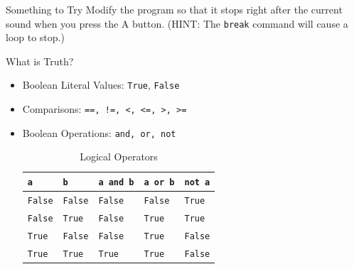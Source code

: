 \documentclass[handout]{beamer}
\newenvironment{code}{%
 \VerbatimEnvironment
 \begin{adjustbox}{max width=\textwidth, max height=0.7\textheight}
 \begin{BVerbatim}
  }{
  \end{BVerbatim}
 \end{adjustbox}
}
\begin{document}
\begin{frame}{Something to Try}
        Modify the program so that it stops right after the current sound when you press the A button. (HINT: The \texttt{break} command will cause a loop to stop.)
\end{frame}

\begin{frame}{What is Truth?}
    \begin{itemize}
        \item Boolean Literal Values: \texttt{True}, \texttt{False}
        \item Comparisons: \texttt{==, !=, <, <=, >, >=}
        \item Boolean Operations: \texttt{and, or, not}
        \begin{table}[h]
            \centering
            \begin{tabular}{ll|lll}
                 \texttt{a} & \texttt{b} & \texttt{a and b} & \texttt{a or b} & \texttt{not a}  \\
                 \hline
                 \texttt{False} & \texttt{False} & \texttt{False} & \texttt{False} & \texttt{True}  \\
                 \texttt{False} & \texttt{True} & \texttt{False} & \texttt{True} & \texttt{True}  \\
                 \texttt{True} & \texttt{False} & \texttt{False} & \texttt{True} & \texttt{False}  \\
                 \texttt{True} & \texttt{True} & \texttt{True} & \texttt{True} & \texttt{False}  \\
            \end{tabular}
            \caption{Logical Operators}
            \label{tab:my_label}
        \end{table}
    \end{itemize}
\end{frame}


\end{document}
